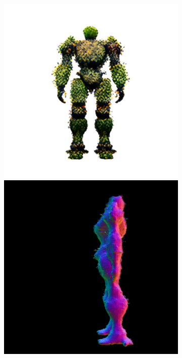 \begin{figure}[ht]
\begin{subfigure}[b]{0.222\textwidth}
        \includegraphics[width=\textwidth]{etc/a robot made out of plants/magic123/magic123_coarse_robot_back_10000_part1.png}
        \includegraphics[width=\textwidth]{etc/a robot made out of plants/magic123/magic123_coarse_robot_left_10000_part2.png}

\end{subfigure}
\end{figure}

